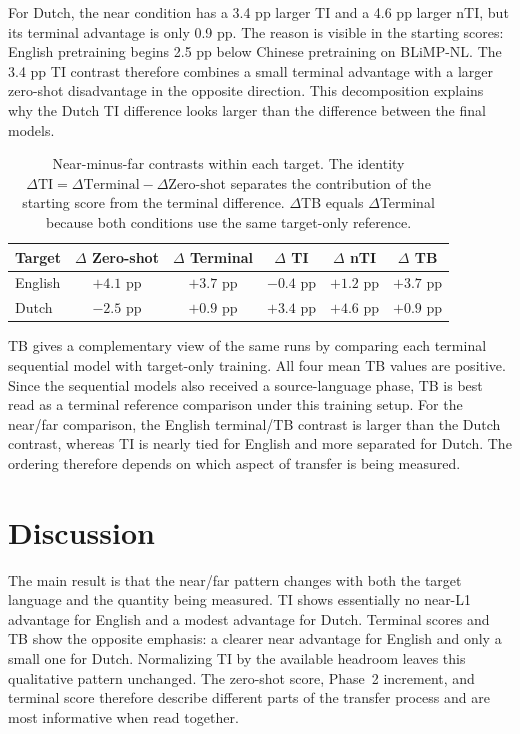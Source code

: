\documentclass[11pt]{article}
\begin{document}
For Dutch, the near condition has a 3.4 pp larger TI and a 4.6 pp larger nTI, but its terminal advantage is only 0.9 pp. The reason is visible in the starting scores: English pretraining begins 2.5 pp below Chinese pretraining on BLiMP-NL. The 3.4 pp TI contrast therefore combines a small terminal advantage with a larger zero-shot disadvantage in the opposite direction. This decomposition explains why the Dutch TI difference looks larger than the difference between the final models.

\begin{table}[tb]
\centering
\small
\begin{tabular}{lccccc}
\hline
\textbf{Target} & \textbf{$\Delta$ Zero-shot} & \textbf{$\Delta$ Terminal} & \textbf{$\Delta$ TI} & \textbf{$\Delta$ nTI} & \textbf{$\Delta$ TB} \\ \hline
English & $+4.1$ pp & $+3.7$ pp & $-0.4$ pp & $+1.2$ pp & $+3.7$ pp \\
Dutch   & $-2.5$ pp & $+0.9$ pp & $+3.4$ pp & $+4.6$ pp & $+0.9$ pp \\ \hline
\end{tabular}
\caption{Near-minus-far contrasts within each target. The identity $\Delta\mathrm{TI}=\Delta\mathrm{Terminal}-\Delta\mathrm{Zero\mbox{-}shot}$ separates the contribution of the starting score from the terminal difference. $\Delta$TB equals $\Delta$Terminal because both conditions use the same target-only reference.}
\label{tab:contrast-decomposition}
\end{table}

TB gives a complementary view of the same runs by comparing each terminal sequential model with target-only training. All four mean TB values are positive. Since the sequential models also received a source-language phase, TB is best read as a terminal reference comparison under this training setup. For the near/far comparison, the English terminal/TB contrast is larger than the Dutch contrast, whereas TI is nearly tied for English and more separated for Dutch. The ordering therefore depends on which aspect of transfer is being measured.

\section{Discussion}

The main result is that the near/far pattern changes with both the target language and the quantity being measured. TI shows essentially no near-L1 advantage for English and a modest advantage for Dutch. Terminal scores and TB show the opposite emphasis: a clearer near advantage for English and only a small one for Dutch. Normalizing TI by the available headroom leaves this qualitative pattern unchanged. The zero-shot score, Phase~2 increment, and terminal score therefore describe different parts of the transfer process and are most informative when read together.
\end{document}
